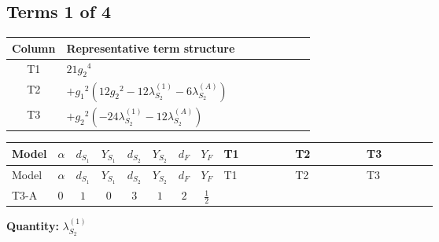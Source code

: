 \documentclass[8pt]{article}
\begin{document}
\begin{landscape}
\subsection*{Terms 1 of 4}
\begin{center}
\begin{tabular}{@{}c >{\raggedright\arraybackslash}p{0.82\linewidth}@{}}
\toprule
Column & Representative term structure \\
\midrule
T1 & \(\displaystyle 21 {g_2}^4\) \\
\midrule
T2 & \(\displaystyle +{g_1}^2 \left(12 {g_2}^2-12 {\lambda_{S_2}^{(1)}}-6 {\lambda_{S_2}^{(A)}}\right)\) \\
\midrule
T3 & \(\displaystyle +{g_2}^2 (-24 {\lambda_{S_2}^{(1)}}-12 {\lambda_{S_2}^{(A)}})\) \\
\midrule
\bottomrule
\end{tabular}
\end{center}
\smallskip
\tiny
\begin{longtable}{@{}llcccccc >{\raggedright\arraybackslash}p{0.21\linewidth} >{\raggedright\arraybackslash}p{0.21\linewidth} >{\raggedright\arraybackslash}p{0.21\linewidth}@{}}
\toprule
Model & $\alpha$ & $d_{S_1}$ & $Y_{S_1}$ & $d_{S_2}$ & $Y_{S_2}$ & $d_F$ & $Y_F$ & T1 & T2 & T3 \\
\midrule
\endfirsthead
\toprule
Model & $\alpha$ & $d_{S_1}$ & $Y_{S_1}$ & $d_{S_2}$ & $Y_{S_2}$ & $d_F$ & $Y_F$ & T1 & T2 & T3 \\
\midrule
\endhead
T3-A & $0$ & $1$ & $0$ & $3$ & $1$ & $2$ & $\frac{1}{2}$ & \scriptsize\adjustbox{max width=\linewidth}{$\begin{gathered} 21 {g_2}^4\end{gathered}$} & \scriptsize\adjustbox{max width=\linewidth}{$\begin{gathered} +{g_1}^2 \left(12 {g_2}^2-12 {\lambda_{S_2}^{(1)}}-6 {\lambda_{S_2}^{(A)}}\right)\end{gathered}$} & \scriptsize\adjustbox{max width=\linewidth}{$\begin{gathered} +{g_2}^2 (-24 {\lambda_{S_2}^{(1)}}-12 {\lambda_{S_2}^{(A)}})\end{gathered}$} \\
\midrule
\bottomrule
\end{longtable}
\clearpage
\noindent\textbf{Quantity: }$\lambda_{S_2}^{(1)}$\par\smallskip

\end{landscape}
\end{document}
